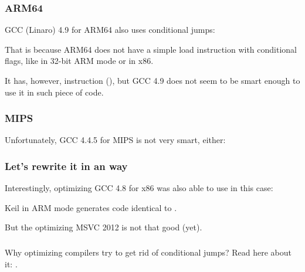 

\subsubsection{ARM64}

\Optimizing GCC (Linaro) 4.9 for ARM64 also uses conditional jumps:



That is because ARM64 does not have a simple load instruction with conditional flags,
like  in 32-bit ARM mode or  in x86.

It has, however,  instruction (),
but GCC 4.9 does not seem to be smart enough to use it in such piece of code.

\subsubsection{MIPS}

Unfortunately, GCC 4.4.5 for MIPS is not very smart, either:



\subsubsection{Let's rewrite it in an  way}




Interestingly, optimizing GCC 4.8 for x86 was also able to use  in this case:



\Optimizing Keil in ARM mode generates code identical to .

But the optimizing MSVC 2012 is not that good (yet).

\subsubsection{\Conclusion{}}

Why optimizing compilers try to get rid of conditional jumps? Read here about it: .
